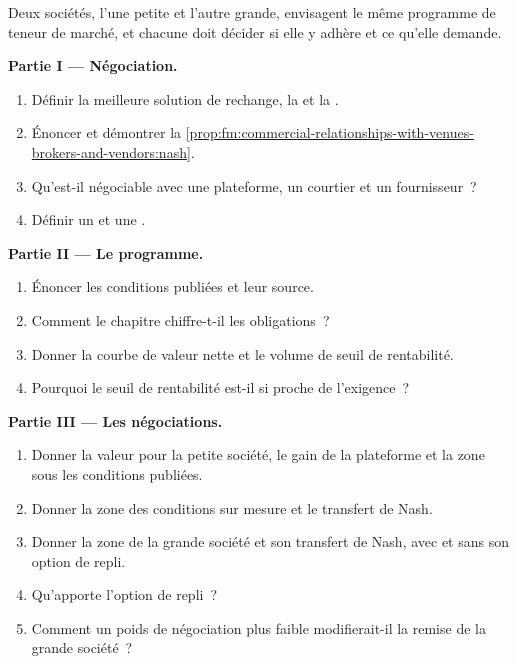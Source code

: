 \begin{problem}\label{pb:fm:commercial-relationships-with-venues-brokers-and-vendors:1}
Deux sociétés, l'une petite et l'autre grande, envisagent le même programme de teneur de marché, et chacune doit décider si elle y adhère et ce qu'elle demande.

\medskip\noindent\textbf{Partie I --- Négociation.}
\begin{enumerate}
\item Définir la meilleure solution de rechange, la  et la .
\item Énoncer et démontrer la \cref{prop:fm:commercial-relationships-with-venues-brokers-and-vendors:nash}.
\item Qu'est-il négociable avec une plateforme, un courtier et un fournisseur~?
\item Définir un  et une .
\end{enumerate}

\medskip\noindent\textbf{Partie II --- Le programme.}
\begin{enumerate}[resume]
\item Énoncer les conditions publiées et leur source.
\item Comment le chapitre chiffre-t-il les obligations~?
\item Donner la courbe de valeur nette et le volume de seuil de rentabilité.
\item Pourquoi le seuil de rentabilité est-il si proche de l'exigence~?
\end{enumerate}

\medskip\noindent\textbf{Partie III --- Les négociations.}
\begin{enumerate}[resume]
\item Donner la valeur pour la petite société, le gain de la plateforme et la zone sous les conditions publiées.
\item Donner la zone des conditions sur mesure et le transfert de Nash.
\item Donner la zone de la grande société et son transfert de Nash, avec et sans son option de repli.
\item Qu'apporte l'option de repli~?
\item Comment un poids de négociation plus faible modifierait-il la remise de la grande société~?
\end{enumerate}


\end{problem}
